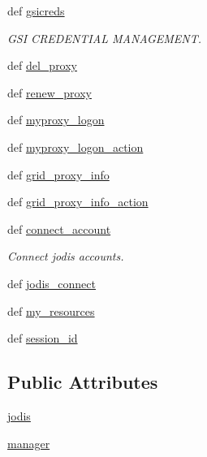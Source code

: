 \begin{DoxyCompactItemize}
\item 
def \hyperlink{classcyberweb_1_1controllers_1_1user_1_1_user_controller_ab03ec01d4380e85974a6149820dc7b44}{gsicreds}
\begin{DoxyCompactList}\small\item\em \-G\-S\-I \-C\-R\-E\-D\-E\-N\-T\-I\-A\-L \-M\-A\-N\-A\-G\-E\-M\-E\-N\-T. \end{DoxyCompactList}\item 
def \hyperlink{classcyberweb_1_1controllers_1_1user_1_1_user_controller_ac1e189e7fd51edda73c6b86d0c3eaf8f}{del\-\_\-proxy}
\item 
def \hyperlink{classcyberweb_1_1controllers_1_1user_1_1_user_controller_a4f14ef94ce0d9a04e96a9ad56ac8e3d3}{renew\-\_\-proxy}
\item 
def \hyperlink{classcyberweb_1_1controllers_1_1user_1_1_user_controller_acde07c2fe21aca5f7320cee7c154e2bc}{myproxy\-\_\-logon}
\item 
def \hyperlink{classcyberweb_1_1controllers_1_1user_1_1_user_controller_a2f5e86fe602d53bf4a8157a7e1357fbe}{myproxy\-\_\-logon\-\_\-action}
\item 
def \hyperlink{classcyberweb_1_1controllers_1_1user_1_1_user_controller_ae39b81ca4fd576c214d1e7be4a7d1fea}{grid\-\_\-proxy\-\_\-info}
\item 
def \hyperlink{classcyberweb_1_1controllers_1_1user_1_1_user_controller_adaf7ed600f686e78731a7ab9c956a865}{grid\-\_\-proxy\-\_\-info\-\_\-action}
\item 
def \hyperlink{classcyberweb_1_1controllers_1_1user_1_1_user_controller_a46c5d176cc2a437009544e20f2a21826}{connect\-\_\-account}
\begin{DoxyCompactList}\small\item\em \-Connect jodis accounts. \end{DoxyCompactList}\item 
def \hyperlink{classcyberweb_1_1controllers_1_1user_1_1_user_controller_a0b49093554f6603b73ed5c1868fc9d4f}{jodis\-\_\-connect}
\item 
def \hyperlink{classcyberweb_1_1controllers_1_1user_1_1_user_controller_a21ba6193776f606fea098f233a05e2f5}{my\-\_\-resources}
\item 
def \hyperlink{classcyberweb_1_1controllers_1_1user_1_1_user_controller_a8fca08a90e7d17349cb8228d7a27db97}{session\-\_\-id}
\end{DoxyCompactItemize}
\subsection*{\-Public \-Attributes}
\begin{DoxyCompactItemize}
\item 
\hyperlink{classcyberweb_1_1controllers_1_1user_1_1_user_controller_aa6dca6d67ffc76233314fcac8c977255}{jodis}
\item 
\hyperlink{classcyberweb_1_1controllers_1_1user_1_1_user_controller_a8879315663ddbe6134aa5632d9f2ae58}{manager}
\end{DoxyCompactItemize}



